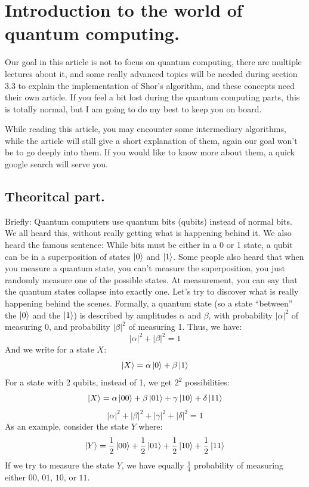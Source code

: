 \section{Introduction to the world of quantum computing.}
\begin{notebox}
    Our goal in this article is not to focus on quantum computing, there are multiple lectures about it, and some really advanced topics will be needed during section 3.3 to explain the implementation of Shor’s algorithm, and these concepts need their own article. If you feel a bit lost during the quantum computing parts, this is totally normal, but I am going to do my best to keep you on board.
\end{notebox}

\begin{notebox}
    While reading this article, you may encounter some intermediary algorithms, while the article will still give a short explanation of them, again our goal won’t be to go deeply into them. If you would like to know more about them, a quick google search will serve you.
\end{notebox}
    
\subsection{Theoritcal part.}

Briefly: Quantum computers use quantum bits (qubits) instead of normal bits.\nl
We all heard this, without really getting what is happening behind it. We also heard the famous sentence: While bits must be either in a 0 or 1 state, a qubit can be in a superposition of states $\ket{0}$ and $\ket{1}$. Some people also heard that when you measure a quantum state, you can’t measure the superposition, you just randomly measure one of the possible states. At measurement, you can say that the quantum states collapse into exactly one. Let’s try to discover what is really happening behind the scenes.\nl
Formally, a quantum state (so a state “between” the $ \ket{0} $ and the $ \ket{1} $) is described by amplitudes $ \alpha $ and $ \beta $, with probability $ |\alpha|^2 $ of measuring 0, and probability $ |\beta|^2 $ of measuring 1. Thus, we have:
$$
|\alpha|^2 + |\beta|^2 = 1
$$
And we write for a state $ X $:
$$
\ket{X} = \alpha \ket{0} + \beta \ket{1}
$$
For a state with 2 qubits, instead of 1, we get $ 2^2 $ possibilities:
$$
\ket{X} = \alpha \ket{00} + \beta \ket{01} + \gamma \ket{10} + \delta \ket{11}
$$
$$
|\alpha|^2 + |\beta|^2 + |\gamma|^2 + |\delta|^2 = 1
$$
As an example, consider the state $ Y $ where:
$$
\ket{Y} = \frac{1}{2} \ket{00} + \frac{1}{2} \ket{01} + \frac{1}{2} \ket{10} + \frac{1}{2} \ket{11}
$$
If we try to measure the state $ Y $, we have equally $ \frac{1}{4} $ probability of measuring either $ 00 $, $ 01 $, $ 10 $, or $ 11 $.
